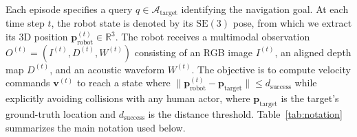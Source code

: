 Each episode specifies a query $q \in \mathcal{A}_{\mathrm{target}}$ identifying the navigation goal. At each time step $t$, the robot state is denoted by its $\mathrm{SE}(3)$ pose, from which we extract its 3D position $\mathbf{p}_{\mathrm{robot}}^{(t)} \in \mathbb{R}^3$. The robot receives a multimodal observation $O^{(t)} = (I^{(t)}, D^{(t)}, W^{(t)})$ consisting of an RGB image $I^{(t)}$, an aligned depth map $D^{(t)}$, and an acoustic waveform $W^{(t)}$. The objective is to compute velocity commands $\mathbf{v}^{(t)}$ to reach a state where $\|\mathbf{p}_{\mathrm{robot}}^{(t)} - \mathbf{p}_{\mathrm{target}}\| \le d_{\mathrm{success}}$ while explicitly avoiding collisions with any human actor, where $\mathbf{p}_{\mathrm{target}}$ is the target's ground-truth location and $d_{\mathrm{success}}$ is the distance threshold. Table~\ref{tab:notation} summarizes the main notation used below.

